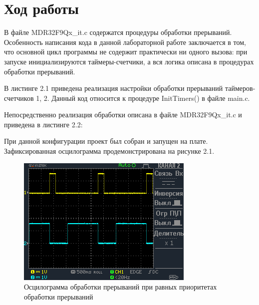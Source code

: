 \documentclass[14pt,a4paper,report]{report}
\begin{document}
\section {Ход работы}


%
%
В файле  MDR32F9Qx\_it.c содержатся процедуры обработки прерываний. Особенность написания кода в данной лабораторной работе заключается в том, что основной цикл программы не содержит практически ни одного вызова: при запуске инициализируются таймеры-счетчики, а вся логика описана в процедурах обработки прерываний.

В листинге 2.1 приведена реализация настройки обработки прерываний таймеров-счетчиков 1, 2. Данный код относится к процедуре InitTimers() в файле main.c.



Непосредственно реализация обработки описана в файле MDR32F9Qx\_it.c и приведена в листинге 2.2:



При данной конфигурации проект был собран и запущен на плате. Зафиксированная осцилограмма продемонстрирована на рисунке 2.1.

\begin{figure}[h!]
	\centering
	\includegraphics[scale = 1]{img/2_1.png}
	\caption{Осцилограмма обработки прерываний при равных приоритетах обработки прерываний}
\end{figure}
\end{document}

